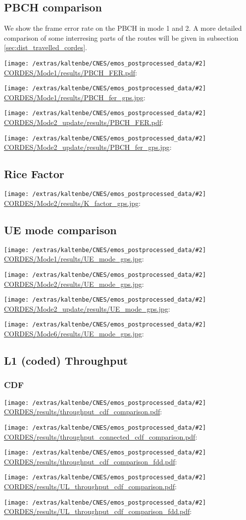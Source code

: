 \documentclass[a4paper,10pt]{article}
\newcommand{\printfile}[2][]{
 \begin{minipage}{8cm}
  \centering
  \texttt{[image: /extras/kaltenbe/CNES/emos\_postprocessed\_data/\#2]}
  \url{#2}: #1

 \end{minipage}
}
\begin{document}
\subsection{PBCH comparison}
We show the frame error rate on the PBCH in mode 1 and 2. A more detailed comparison of some interresing parts of the routes will be given in subsection \ref{sec:dist_travelled_cordes}.

\printfile{CORDES/Mode1/results/PBCH_FER.pdf}
\printfile{CORDES/Mode1/results/PBCH_fer_gps.jpg}

\printfile{CORDES/Mode2_update/results/PBCH_FER.pdf}
\printfile{CORDES/Mode2_update/results/PBCH_fer_gps.jpg}

\subsection{Rice Factor}

\printfile{CORDES/Mode2/results/K_factor_gps.jpg}

\subsection{UE mode comparison}

\printfile{CORDES/Mode1/results/UE_mode_gps.jpg}
\printfile{CORDES/Mode2/results/UE_mode_gps.jpg}

\printfile{CORDES/Mode2_update/results/UE_mode_gps.jpg}
\printfile{CORDES/Mode6/results/UE_mode_gps.jpg}

\subsection{L1 (coded) Throughput}


\subsubsection{CDF}


\printfile{CORDES/results/throughput_cdf_comparison.pdf}
\printfile{CORDES/results/throughput_connected_cdf_comparison.pdf}

\printfile{CORDES/results/throughput_cdf_comparison_fdd.pdf}

\printfile{CORDES/results/UL_throughput_cdf_comparison.pdf}
\printfile{CORDES/results/UL_throughput_cdf_comparison_fdd.pdf}
\end{document}
